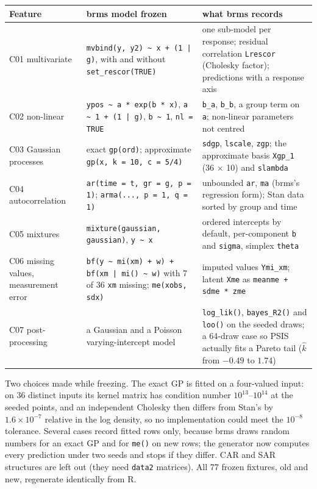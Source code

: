 \documentclass[11pt]{article}
\newcommand{\code}[1]{\texttt{#1}}
\begin{document}
\small
\begin{center}\begin{tabular}{@{}>{\raggedright\arraybackslash}p{}>{\raggedright\arraybackslash}p{}>{\raggedright\arraybackslash}p{}@{}}
\toprule
Feature & brms model frozen & what brms records \\
\midrule
C01 multivariate & \code{mvbind(y, y2) \textasciitilde{} x + (1 | g)}, with and without \code{set\_rescor(TRUE)} & one sub-model per response; residual correlation \code{Lrescor} (Cholesky factor); predictions with a response axis \\
C02 non-linear & \code{ypos \textasciitilde{} a * exp(b * x)}, \code{a \textasciitilde{} 1 + (1 | g)}, \code{b \textasciitilde{} 1}, \code{nl = TRUE} & \code{b\_a}, \code{b\_b}, a group term on \code{a}; non-linear parameters not centred \\
C03 Gaussian processes & exact \code{gp(ord)}; approximate \code{gp(x, k = 10, c = 5/4)} & \code{sdgp}, \code{lscale}, \code{zgp}; the approximate basis \code{Xgp\_1} (36 $\times$ 10) and \code{slambda} \\
C04 autocorrelation & \code{ar(time = t, gr = g, p = 1)}; \code{arma(..., p = 1, q = 1)} & unbounded \code{ar}, \code{ma} (brms's regression form); Stan data sorted by group and time \\
C05 mixtures & \code{mixture(gaussian, gaussian)}, \code{y \textasciitilde{} x} & ordered intercepts by default, per-component \code{b} and \code{sigma}, simplex \code{theta} \\
C06 missing values, measurement error & \code{bf(y \textasciitilde{} mi(xm) + w) + bf(xm | mi() \textasciitilde{} w)} with 7 of 36 \code{xm} missing; \code{me(xobs, sdx)} & imputed values \code{Ymi\_xm}; latent \code{Xme} as \code{meanme + sdme * zme} \\
C07 post-processing & a Gaussian and a Poisson varying-intercept model & \code{log\_lik()}, \code{bayes\_R2()} and \code{loo()} on the seeded draws; a 64-draw case so PSIS actually fits a Pareto tail ($\hat k$ from $-0.49$ to $1.74$) \\
\bottomrule
\end{tabular}\end{center}
\normalsize

\noindent Two choices made while freezing. The exact GP is fitted on a four-valued input: on 36 distinct inputs its
kernel matrix has condition number $10^{13}$--$10^{14}$ at the seeded points, and an independent Cholesky then differs
from Stan's by $1.6\times10^{-7}$ relative in the log density, so no implementation could meet the $10^{-8}$
tolerance. Several cases record fitted rows only, because brms draws random numbers for an exact GP and for
\code{me()} on new rows; the generator now computes every prediction under two seeds and stops if they differ. CAR
and SAR structures are left out (they need \code{data2} matrices). All 77 frozen fixtures, old and new, regenerate
identically from R.
\end{document}
